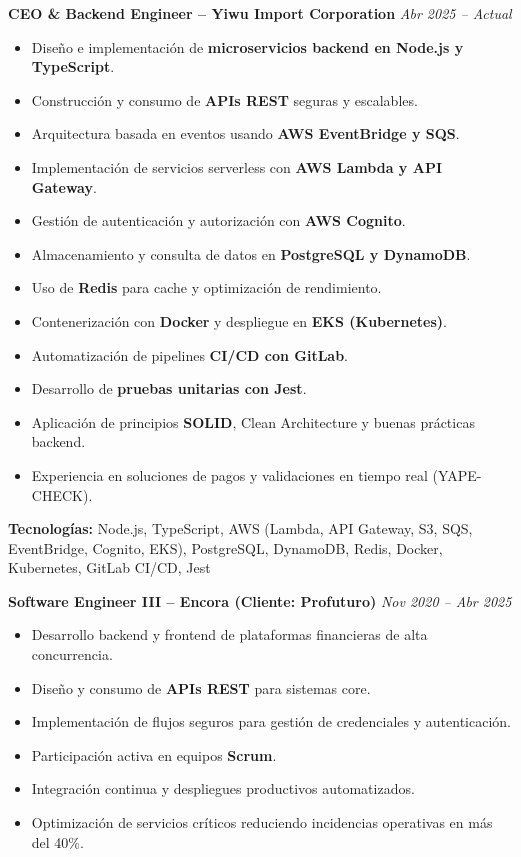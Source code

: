 \documentclass[11pt,a4paper]{article}
\begin{document}
\textbf{CEO \& Backend Engineer – Yiwu Import Corporation} \hfill \textit{Abr 2025 – Actual}
\begin{itemize}[leftmargin=*]
  \item Diseño e implementación de \textbf{microservicios backend en Node.js y TypeScript}.
  \item Construcción y consumo de \textbf{APIs REST} seguras y escalables.
  \item Arquitectura basada en eventos usando \textbf{AWS EventBridge y SQS}.
  \item Implementación de servicios serverless con \textbf{AWS Lambda y API Gateway}.
  \item Gestión de autenticación y autorización con \textbf{AWS Cognito}.
  \item Almacenamiento y consulta de datos en \textbf{PostgreSQL y DynamoDB}.
  \item Uso de \textbf{Redis} para cache y optimización de rendimiento.
  \item Contenerización con \textbf{Docker} y despliegue en \textbf{EKS (Kubernetes)}.
  \item Automatización de pipelines \textbf{CI/CD con GitLab}.
  \item Desarrollo de \textbf{pruebas unitarias con Jest}.
  \item Aplicación de principios \textbf{SOLID}, Clean Architecture y buenas prácticas backend.
  \item Experiencia en soluciones de pagos y validaciones en tiempo real (YAPE-CHECK).
\end{itemize}

\textbf{Tecnologías:} Node.js, TypeScript, AWS (Lambda, API Gateway, S3, SQS, EventBridge, Cognito, EKS), PostgreSQL, DynamoDB, Redis, Docker, Kubernetes, GitLab CI/CD, Jest

\vspace{12pt}

\textbf{Software Engineer III – Encora (Cliente: Profuturo)} \hfill \textit{Nov 2020 – Abr 2025}
\begin{itemize}[leftmargin=*]
  \item Desarrollo backend y frontend de plataformas financieras de alta concurrencia.
  \item Diseño y consumo de \textbf{APIs REST} para sistemas core.
  \item Implementación de flujos seguros para gestión de credenciales y autenticación.
  \item Participación activa en equipos \textbf{Scrum}.
  \item Integración continua y despliegues productivos automatizados.
  \item Optimización de servicios críticos reduciendo incidencias operativas en más del 40\%.
\end{itemize}
\end{document}
